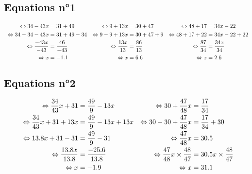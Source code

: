 \documentclass{article}%
\begin{document}
\subsection{Equations n°1}%
\label{subsec:Equationsn1}%
\begin{align*}%
\  \Leftrightarrow 34 - 43x &= 31 + 49     & \Leftrightarrow 9 + 13x  &= 30 + 47       & \Leftrightarrow 48 + 17 &= 34x - 22\\%
\vspace{5mm}%
\newline%
\  \Leftrightarrow 34 - 34 - 43x &= 31 + 49 -34      & \Leftrightarrow 9 - 9 + 13x  &= 30 + 47 + 9        & \Leftrightarrow 48 + 17 + 22 &= 34x - 22 +22\\%
\vspace{5mm}%
\newline%
\  \Leftrightarrow \frac{-43x}{-43} &= \frac{46}{-43}      & \Leftrightarrow \frac{13x}{13} &= \frac{86}{13}      & \Leftrightarrow \frac{87}{34} &= \frac{34x}{34}\\%
\vspace{5mm}%
\newline%
\  \Leftrightarrow  x &= -1.1      & \Leftrightarrow  x &= 6.6      & \Leftrightarrow  x &= 2.6\\%
\end{align*}

%
\subsection{Equations n°2}%
\label{subsec:Equationsn2}%
\begin{align*}%
\  \Leftrightarrow \frac{34}{43}x + 31 &= \frac{49}{9} - 13x       &     \Leftrightarrow 30 + \frac{47}{48}x &= \frac{17}{34} \\%
\vspace{5mm}%
\newline%
\  \Leftrightarrow \frac{34}{43}x + 31 + 13x  &= \frac{49}{9} - 13x +13x    &    \Leftrightarrow 30 - 30 + \frac{47}{48}x &= \frac{17}{34} + 30\\%
\vspace{5mm}%
\newline%
\  \Leftrightarrow 13.8x + 31 - 31 &= \frac{49}{9}	- 31       &      \Leftrightarrow \frac{47}{48}x &= 30.5 \\%
\vspace{5mm}%
\newline%
\  \Leftrightarrow \frac{13.8x}{13.8} &= \frac{-25.6}{13.8}     &      \Leftrightarrow \frac{47}{48}x \times \frac{48}{47} &= 30.5 x \times \frac{48}{47}\\%
\vspace{5mm}%
\newline%
\  \Leftrightarrow x &= -1.9    &     \Leftrightarrow x &= 31.1 \\%
\vspace{5mm}%
\newline%
\end{align*}

%
\newpage%
\end{document}

